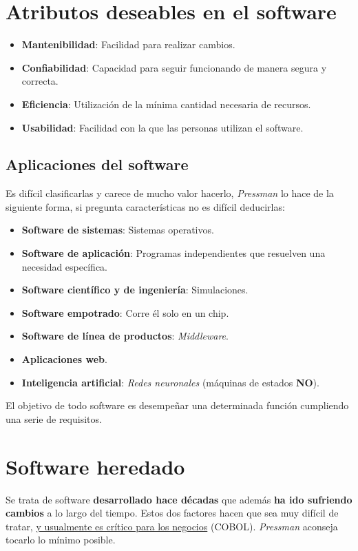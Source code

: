 \section{Atributos deseables en el software}
\begin{itemize}
    \item \textbf{Mantenibilidad}: Facilidad para realizar cambios.
    \item \textbf{Confiabilidad}: Capacidad para seguir funcionando de manera segura y correcta. 
    \item \textbf{Eficiencia}: Utilización de la mínima cantidad necesaria de recursos.
    \item \textbf{Usabilidad}: Facilidad con la que las personas utilizan el software.
\end{itemize}

\subsection{Aplicaciones del software}
Es difícil clasificarlas y carece de mucho valor hacerlo, \textit{Pressman} lo hace de la siguiente forma, si pregunta características no es difícil deducirlas:
\begin{itemize}
    \item \textbf{Software de sistemas}: Sistemas operativos.
    \item \textbf{Software de aplicación}: Programas independientes que resuelven una necesidad específica.
    \item \textbf{Software científico y de ingeniería}: Simulaciones.
    \item \textbf{Software empotrado}: Corre él solo en un chip.
    \item \textbf{Software de línea de productos}: \textit{Middleware}.
    \item \textbf{Aplicaciones web}.
    \item \textbf{Inteligencia artificial}: \textit{Redes neuronales} (máquinas de estados \textbf{NO}).
\end{itemize}
El objetivo de todo software es desempeñar una determinada función cumpliendo una serie de requisitos.

\section{Software heredado}
Se trata de software \textbf{desarrollado hace décadas} %
que además \textbf{ha ido sufriendo cambios} a lo largo del tiempo. Estos dos factores hacen que sea muy difícil de tratar, \uline{y usualmente es crítico para los negocios} (COBOL). \textit{Pressman} aconseja tocarlo lo mínimo posible. 

